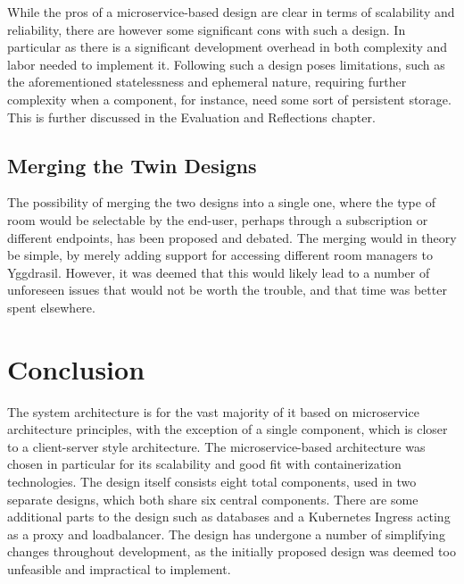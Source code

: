 While the pros of a microservice-based design are clear in terms of scalability and reliability, there are however some significant cons with such a design. In particular as there is a significant development overhead in both complexity and labor needed to implement it. Following such a design poses limitations, such as the aforementioned statelessness and ephemeral nature, requiring further complexity when a component, for instance, need some sort of persistent storage. This is further discussed in the Evaluation and Reflections chapter.


\subsection{Merging the Twin Designs}

The possibility of merging the two designs into a single one, where the type of room would be selectable by the end-user, perhaps through a subscription or different endpoints, has been proposed and debated. The merging would in theory be simple, by merely adding support for accessing different room managers to Yggdrasil. However, it was deemed that this would likely lead to a number of unforeseen issues that would not be worth the trouble, and that time was better spent elsewhere.

\section{Conclusion}

The system architecture is for the vast majority of it based on microservice architecture principles, with the exception of a single component, which is closer to a client-server style architecture. The microservice-based architecture was chosen in particular for its scalability and good fit with containerization technologies. The design itself consists eight total components, used in two separate designs, which both share six central components. There are some additional parts to the design such as databases and a Kubernetes Ingress acting as a proxy and loadbalancer. The design has undergone a number of simplifying changes throughout development, as the initially proposed design was deemed too unfeasible and impractical to implement.